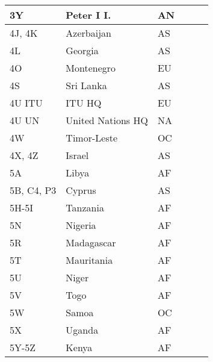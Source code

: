 \documentclass[a4paper]{article}
\begin{document}
\begin{longtable}{|p{1.5cm}|p{4cm}|l|p{2cm}|p{2cm}|p{2cm}|}
\hline
3Y                     & Peter I I.                                 & AN    & & & \\
\hline
4J, 4K                 & Azerbaijan                                 & AS    & & & \\
\hline
4L                     & Georgia                                    & AS    & & & \\
\hline
4O                     & Montenegro                                 & EU    & & & \\
\hline
4S                     & Sri Lanka                                  & AS    & & & \\
\hline
4U ITU                 & ITU HQ                                     & EU    & & & \\
\hline
4U UN                  & United Nations HQ                          & NA    & & & \\
\hline
4W                     & Timor-Leste                                & OC    & & & \\
\hline
4X, 4Z                 & Israel                                     & AS    & & & \\
\hline
5A                     & Libya                                      & AF    & & & \\
\hline
5B, C4, P3             & Cyprus                                     & AS    & & & \\
\hline
5H-5I                  & Tanzania                                   & AF    & & & \\
\hline
5N                     & Nigeria                                    & AF    & & & \\
\hline
5R                     & Madagascar                                 & AF    & & & \\
\hline
5T                     & Mauritania                                 & AF    & & & \\
\hline
5U                     & Niger                                      & AF    & & & \\
\hline
5V                     & Togo                                       & AF    & & & \\
\hline
5W                     & Samoa                                      & OC    & & & \\
\hline
5X                     & Uganda                                     & AF    & & & \\
\hline
5Y-5Z                  & Kenya                                      & AF    & & & \\

\end{longtable}
\end{document}
